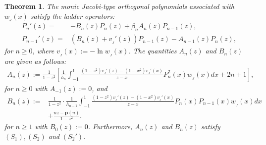\documentclass[12pt,a4paper]{article}    %
\newtheorem{theorem}{Theorem}[section]
\numberwithin{equation}{section}
\begin{document}
\begin{theorem}\label{main-J}
The monic Jacobi-type orthogonal polynomials associated with $w_{_J}(x)$ satisfy the ladder operators:
\begin{align}
P_n'(z)=&-B_n(z)P_n(z)+\beta_nA_n(z)P_{n-1}(z),\label{loJ}\\
P_{n-1}'(z)=&\left(B_n(z)+v_{_J}'(z)\right)P_{n-1}(z)-A_{n-1}(z)P_n(z),\label{roJ}
\end{align}
for $n\geq0$, where $v_{_J}(x):=-\ln w_{_J}(x)$. The quantities $A_n(z)$ and $B_n(z)$ are given as follows:
\begin{align}\label{An-J}
A_n(z):=\frac{1}{1-z^2}\left[  \frac{1}{h_n}\int_{-1}^{1}\frac{(1-z^2)v_{_J}'(z)-(1-x^2)v_{_J}'(x)}{z-x}P_n^2(x)w_{_J}(x)dx+2n+1 \right],
\end{align}
for $n\geq0$ with $A_{-1}(z):=0$, and
\begin{align}\label{Bn-J}		 B_n(z):=&\frac{1}{1-z^2}\cdot\frac{1}{h_{n-1}}\int_{-1}^{1}\frac{(1-z^2)v_{_J}'(z)-(1-x^2)v_{_J}'(x)}{z-x}P_n(x)P_{n-1}(x)w_{_J}(x)dx\nonumber\\
&+\frac{nz-\mathbf{p}(n)}{1-z^2}, \end{align}
for $n\geq1$ with $B_0(z):=0$. Furthermore, $A_n(z)$ and $B_n(z)$ satisfy $(S_1), (S_2)$ and $(S_2')$.
\end{theorem}
\end{document}
